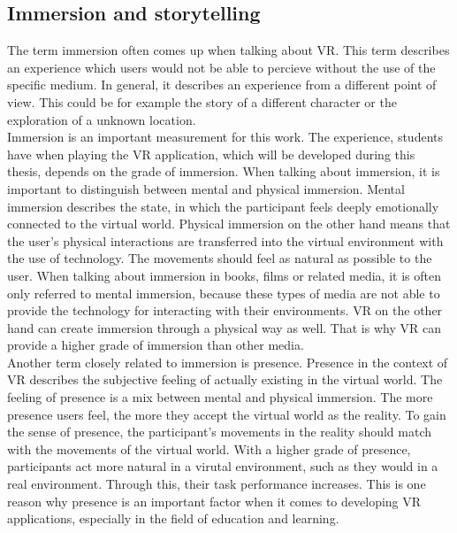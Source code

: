 \subsection{Immersion and storytelling}\label{immersion}
The term immersion often comes up when talking about VR. This term describes an experience which users would not be able to percieve without the use of the specific medium. In general, it describes an experience from a different point of view. This could be for example the story of a different character or the exploration of a unknown location. \cite{Tham.2018} \\ Immersion is an important measurement for this work. The experience, students have when playing the VR application, which will be developed during this thesis, depends on the grade of immersion.
When talking about immersion, it is important to distinguish between  mental and physical immersion. Mental immersion describes the state, in which the participant feels deeply emotionally connected to the virtual world. Physical immersion on the other hand means that the user's physical interactions are transferred into the virtual environment with the use of technology. The movements should feel as natural as possible to the user. When talking about immersion in books, films or related media, it is often only referred to mental immersion, because these types of media are not able to provide the technology for interacting with their environments. VR on the other hand can create immersion through a physical way as well. That is why VR can provide a higher grade of immersion than other media. \cite{Tham.2018}\\
Another term closely related to immersion is presence. Presence in the context of VR describes the subjective feeling of actually existing in the virtual world. The feeling of presence is a mix between mental and physical immersion. The more presence users feel, the more they accept the virtual world as the reality. To gain the sense of presence, the participant's movements in the reality should match with the movements of the virtual world. With a higher grade of presence, participants act more natural in a virutal environment, such as they would in a real environment. Through this, their task performance increases. This is one reason why presence is an important factor when it comes to developing VR applications, especially in the field of education and learning. \cite{Slater.1997}

